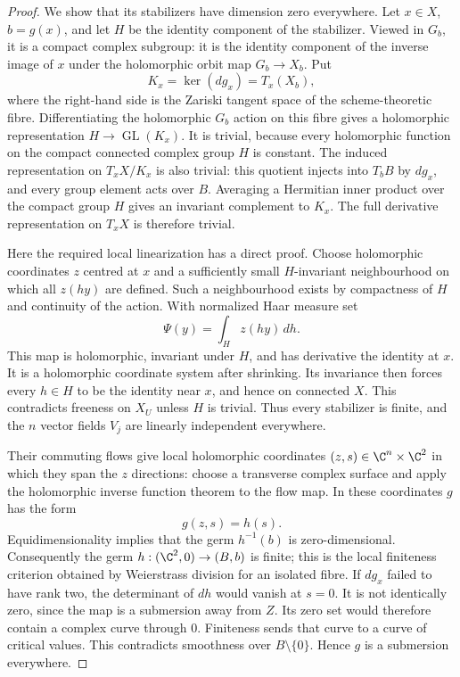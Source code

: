\begin{proof}
We show that its stabilizers have dimension zero everywhere.
Let $x\in X$, $b=g(x)$, and let $H$ be the identity component
of the stabilizer.  Viewed in $G_b$, it is a compact complex
subgroup: it is the identity component of the inverse image
of $x$ under the holomorphic orbit map $G_b\to X_b$.
Put
\[
 K_x=\ker(dg_x)=T_x(X_b),
\]
where the right-hand side is the Zariski tangent space of
the scheme-theoretic fibre.  Differentiating the holomorphic
$G_b$ action on this fibre gives a holomorphic representation
$H\to\operatorname{GL}(K_x)$.  It is trivial, because every
holomorphic function on the compact connected complex group
$H$ is constant.  The induced representation on
$T_xX/K_x$ is also trivial: this quotient injects into
$T_bB$ by $dg_x$, and every group element acts over $B$.
Averaging a Hermitian inner product over the compact group
$H$ gives an invariant complement to $K_x$.  The full
derivative representation on $T_xX$ is therefore trivial.

Here the required local linearization has a direct proof.
Choose holomorphic coordinates $z$ centred at $x$ and a
sufficiently small $H$-invariant neighbourhood on which all
$z(hy)$ are defined.  Such a neighbourhood exists by
compactness of $H$ and continuity of the action.  With
normalized Haar measure set
\[
 \Psi(y)=\int_H z(hy)\,dh.
\]
This map is holomorphic, invariant under $H$, and has
derivative the identity at $x$.  It is a holomorphic
coordinate system after shrinking.  Its invariance then
forces every $h\in H$ to be the identity near $x$, and hence
on connected $X$.  This contradicts freeness on $X_U$ unless
$H$ is trivial.  Thus every stabilizer is finite, and the
$n$ vector fields $V_j$ are linearly independent everywhere.

Their commuting flows give local holomorphic coordinates
$(z,s)\in\C^n\times\C^2$ in which they span the $z$
directions: choose a transverse complex surface and apply
the holomorphic inverse function theorem to the flow map.
In these coordinates $g$ has the form
\[
 g(z,s)=h(s).
\]
Equidimensionality implies that the germ $h^{-1}(b)$ is
zero-dimensional.  Consequently the germ
$h:(\C^2,0)\to(B,b)$ is finite; this is the local finiteness
criterion obtained by Weierstrass division for an isolated
fibre.  If $dg_x$ failed to have rank two, the determinant
of $dh$ would vanish at $s=0$.  It is not identically zero,
since the map is a submersion away from $Z$.  Its zero set
would therefore contain a complex curve through $0$.
Finiteness sends that curve to a curve of critical values.
This contradicts smoothness over $B\setminus\{0\}$.
Hence $g$ is a submersion everywhere.


\end{proof}
